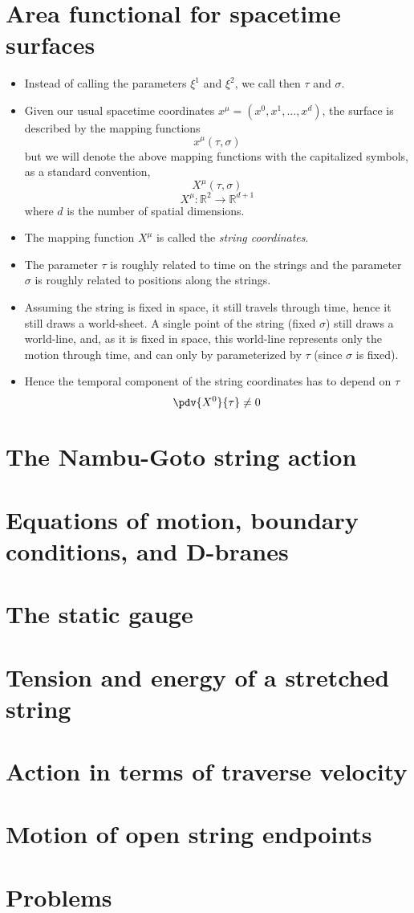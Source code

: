 \documentclass[12pt]{report}
\begin{document}
\section{Area functional for spacetime surfaces}
\begin{itemize}
    \item Instead of calling the parameters $\xi^1$ and $\xi^2$, we call then $\tau$ and $\sigma$.
    \item Given our usual spacetime coordinates $x^{\mu} = \left(x^0, x^1,...,x^d \right)$, the surface is described by the mapping functions
    $$x^{\mu}\left(\tau, \sigma \right)$$
    but we will denote the above mapping functions with the capitalized symbols, as a standard convention,
    $$X^{\mu}\left( \tau, \sigma \right)$$
    $$X^{\mu}: \mathbb{R}^2 \to \mathbb{R}^{d+1}$$
    where $d$ is the number of spatial dimensions.
    \item The mapping function $X^{\mu}$ is called the \textit{string coordinates}.
    \item The parameter $\tau$ is roughly related to time on the strings and the parameter $\sigma$ is roughly related to positions along the strings.
    \item Assuming the string is fixed in space, it still travels through time, hence it still draws a world-sheet. A single point of the string (fixed $\sigma$) still draws a world-line, and, as it is fixed in space, this world-line represents only the motion through time, and can only by parameterized by $\tau$ (since $\sigma$ is fixed).
    \item Hence the temporal component of the string coordinates has to depend on $\tau$
    $$\pdv{X^0}{\tau} \neq 0$$
\end{itemize}
\section{The Nambu-Goto string action}
\section{Equations of motion, boundary conditions, and D-branes}
\section{The static gauge}
\section{Tension and energy of a stretched string}
\section{Action in terms of traverse velocity}
\section{Motion of open string endpoints}
\section{Problems}
\end{document}

